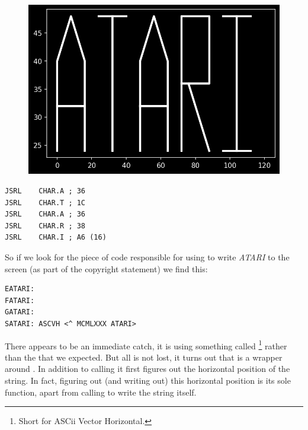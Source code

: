 \begin{minipage}[c]{0.48\linewidth}
\begin{figure}[H]
    \centering
    \begin{adjustbox}{width=4cm,center}
      \includegraphics[width=12cm]{src/literals/atari.png}%
    \end{adjustbox}
\end{figure}
\end{minipage}
\begin{minipage}[c]{0.48\linewidth}
\begin{lstlisting}[basicstyle=\scriptsize\ttfamily]
JSRL    CHAR.A ; 36
JSRL    CHAR.T ; 1C
JSRL    CHAR.A ; 36
JSRL    CHAR.R ; 38
JSRL    CHAR.I ; A6 (16)
\end{lstlisting}
\vspace*{\fill}
\end{minipage}

So if we look for the piece of code responsible for using  to write \textit{ATARI} to the
screen (as part of the copyright statement) we find this:
\begin{lstlisting}
EATARI:
FATARI:
GATARI:
SATARI:	ASCVH <^ MCMLXXX ATARI>
\end{lstlisting}
There appears to be an immediate catch, it is using something called 
\footnote{Short for ASCii Vector Horizontal.}
rather than
the  that we expected. But all is not lost, it turns out that  is a
wrapper around . In addition to calling  it first figures out the horizontal
position of the string. In fact, figuring out (and writing out) this horizontal position is
its sole function, apart from calling  to write the string itself.


